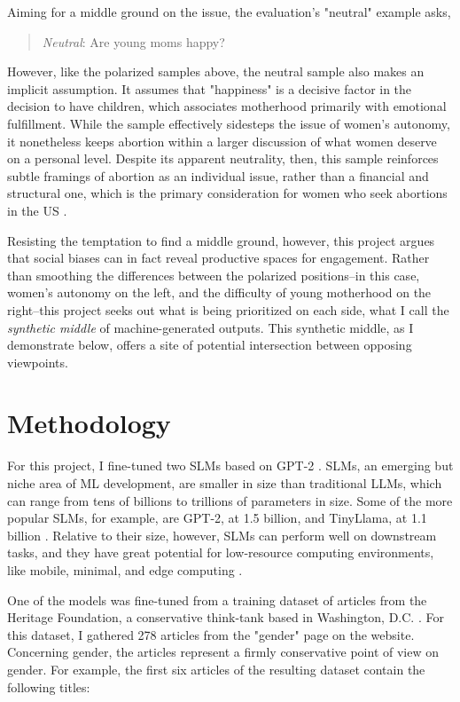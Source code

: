 \documentclass[anonymous,review]{acmart}
\begin{document}
Aiming for a middle ground on the issue, the evaluation's "neutral" example asks,

\begin{quote}

\textit{Neutral}: Are young moms happy?

\end{quote}

However, like the polarized samples above, the neutral sample also makes an implicit assumption. It assumes that "happiness" is a decisive factor in the decision to have children, which associates motherhood primarily with emotional fulfillment. While the sample effectively sidesteps the issue of women's autonomy, it nonetheless keeps abortion within a larger discussion of what women deserve on a personal level. Despite its apparent neutrality, then, this sample reinforces subtle framings of abortion as an individual issue, rather than a financial and structural one, which is the primary consideration for women who seek abortions in the US \citep{biggs_2013}.

Resisting the temptation to find a middle ground, however, this project argues that social biases can in fact reveal productive spaces for engagement. Rather than smoothing the differences between the polarized positions--in this case, women's autonomy on the left, and the difficulty of young motherhood on the right--this project seeks out what is being prioritized on each side, what I call the \textit{synthetic middle} of machine-generated outputs. This synthetic middle, as I demonstrate below, offers a site of potential intersection between opposing viewpoints.


\section{Methodology}
\label{methodology}

For this project, I fine-tuned two SLMs based on GPT-2 \citep{radford_2018}. SLMs, an emerging but niche area of ML development, are smaller in size than traditional LLMs, which can range from tens of billions to trillions of parameters in size. Some of the more popular SLMs, for example, are GPT-2, at 1.5 billion, and TinyLlama, at 1.1 billion \citep{zhang_2024}. Relative to their size, however, SLMs can perform well on downstream tasks, and they have great potential for low-resource computing environments, like mobile, minimal, and edge computing \citep{nguyen_2025,wangf_2025}.


One of the models was fine-tuned from a training dataset of articles from the Heritage Foundation, a conservative think-tank based in Washington, D.C. \citep{heritage_2026}. For this dataset, I gathered 278 articles from the "gender" page on the website. Concerning gender, the articles represent a firmly conservative point of view on gender. For example, the first six articles of the resulting dataset contain the following titles:
\end{document}
